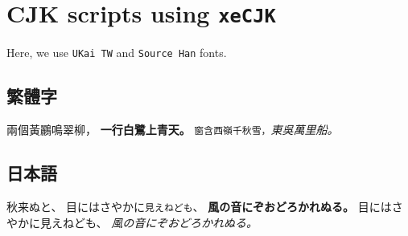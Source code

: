 \documentclass{article}
\numberwithin{equation}{section} %
\begin{document}
\section{CJK scripts using \texttt{xeCJK}}
Here, we use \texttt{UKai TW} and \texttt{Source Han} fonts.
\subsection{繁體字}
兩個黃鸝\textsf{鳴翠柳，} \textbf{一行白鷺上青天。}
\texttt{窗含西嶺千秋雪，}\textit{東吳萬里船。}

{%
	\subsection{日本語}
	秋来ぬと、
	目にはさやかに\texttt{見えねども}、
	\textbf{風の音にぞおどろかれぬる。}
	目にはさやかに\textsf{見えねども}、
	\textit{風の音にぞおどろかれぬる。}
}


\printbibliography
\end{document}
